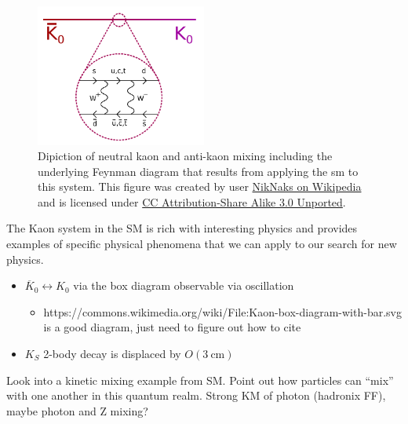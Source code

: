 \begin{figure}
    \centering
    \includegraphics[width=0.5\textwidth]{figures/intro/Kaon-box-diagram-with-bar.pdf}
    \caption{
        Dipiction of neutral kaon and anti-kaon mixing including the underlying
        Feynman diagram that results from applying the \ac{sm} to this system.
        This figure was created by user
        \href{https://commons.wikimedia.org/wiki/File:Kaon-box-diagram-with-bar.svg}{NikNaks on Wikipedia}
        and is licensed under
        \href{https://creativecommons.org/licenses/by-sa/3.0/deed.en}{CC Attribution-Share Alike 3.0 Unported}.
    }
    \label{fig:kaon-box-diagram}
\end{figure}

\begin{todoenv}
The Kaon system in the SM is rich with interesting physics and provides examples of specific
physical phenomena that we can apply to our search for new physics.

\begin{itemize}
  \item \(\overline{K}_0 \leftrightarrow K_0\) via the box diagram observable via oscillation
  \begin{itemize}
    \item https://commons.wikimedia.org/wiki/File:Kaon-box-diagram-with-bar.svg is a good diagram, just need to figure out how to cite
  \end{itemize}
  \item \(K_S\) 2-body decay is displaced by $O(3~\text{cm})$
\end{itemize}

Look into a kinetic mixing example from SM. Point out how particles can ``mix'' with one another
in this quantum realm. Strong KM of photon (hadronix FF), maybe photon and Z mixing?
\end{todoenv}

